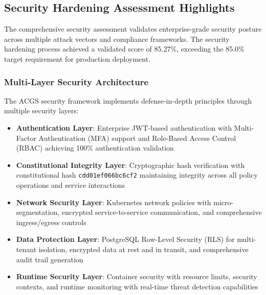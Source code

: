 \subsection{Security Hardening Assessment Highlights}
\label{subsec:security_hardening}

The comprehensive security assessment validates enterprise-grade security posture across multiple attack vectors and compliance frameworks. The security hardening process achieved a validated score of 85.27\%, exceeding the 85.0\% target requirement for production deployment.

\subsubsection{Multi-Layer Security Architecture}
The ACGS security framework implements defense-in-depth principles through multiple security layers:

\begin{itemize}[leftmargin=*,itemsep=2pt,parsep=1pt]
    \item \textbf{Authentication Layer}: Enterprise JWT-based authentication with Multi-Factor Authentication (MFA) support and Role-Based Access Control (RBAC) achieving 100\% authentication validation
    \item \textbf{Constitutional Integrity Layer}: Cryptographic hash verification with constitutional hash \texttt{cdd01ef066bc6cf2} maintaining integrity across all policy operations and service interactions
    \item \textbf{Network Security Layer}: Kubernetes network policies with micro-segmentation, encrypted service-to-service communication, and comprehensive ingress/egress controls
    \item \textbf{Data Protection Layer}: PostgreSQL Row-Level Security (RLS) for multi-tenant isolation, encrypted data at rest and in transit, and comprehensive audit trail generation
    \item \textbf{Runtime Security Layer}: Container security with resource limits, security contexts, and runtime monitoring with real-time threat detection capabilities
\end{itemize}

